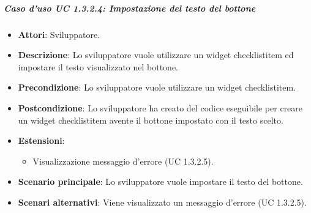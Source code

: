 \subparagraph{Caso d'uso UC 1.3.2.4: Impostazione del testo del bottone}
\FloatBarrier
\begin{itemize}
\item\textbf{Attori}: Sviluppatore.
\item\textbf{Descrizione}: Lo sviluppatore vuole utilizzare un widget checklistitem ed impostare il testo visualizzato nel bottone.
\item\textbf{Precondizione}: Lo sviluppatore vuole utilizzare un widget checklistitem.
\item\textbf{Postcondizione}: Lo sviluppatore ha creato del codice eseguibile per creare un widget checklistitem avente il bottone impostato con il testo scelto.
\item \textbf{Estensioni}: 
\begin{itemize}
\item Visualizzazione messaggio d'errore (UC 1.3.2.5).
\end{itemize}
\item \textbf{Scenario principale}: Lo sviluppatore vuole impostare il testo del bottone.
\item \textbf{Scenari alternativi}: Viene visualizzato un messaggio d'errore (UC 1.3.2.5).
\end{itemize}